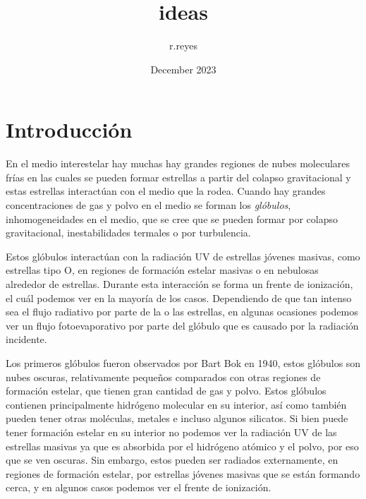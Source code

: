 \documentclass{article}
\title{ideas}
\author{r.reyes }
\date{December 2023}
\begin{document}
\maketitle

\section{Introducción}

En el medio interestelar hay muchas hay grandes regiones de nubes moleculares frías en las cuales se pueden formar estrellas a partir del colapso gravitacional y estas estrellas interactúan con el medio que la rodea. Cuando hay grandes concentraciones de gas y polvo en el medio se forman los \textit{glóbulos}, inhomogeneidades en el medio, que se cree que se pueden formar por colapso gravitacional, inestabilidades termales o por turbulencia. 

Estos glóbulos interactúan con la radiación UV de estrellas jóvenes masivas, como estrellas tipo O, en regiones de formación estelar masivas o en nebulosas alrededor de estrellas. Durante esta interacción se forma un frente de ionización, el cuál podemos ver en la mayoría de los casos. Dependiendo de que tan intenso sea el flujo radiativo por parte de la o las estrellas, en algunas ocasiones podemos ver un flujo fotoevaporativo por parte del glóbulo que es causado por la radiación incidente.

Los primeros glóbulos fueron observados por Bart Bok en 1940, estos glóbulos son nubes oscuras, relativamente pequeños comparados con otras regiones de formación estelar, que tienen gran cantidad de gas y polvo. Estos glóbulos contienen principalmente hidrógeno molecular en su interior, así como también pueden tener otras moléculas, metales e incluso algunos silicatos. Si bien puede tener formación estelar en su interior no podemos ver la radiación UV de las estrellas masivas ya que es absorbida por el hidrógeno atómico y el polvo, por eso que se ven oscuras. Sin embargo, estos pueden ser radiados externamente, en regiones de formación estelar, por estrellas jóvenes masivas que se están formando cerca, y en algunos casos podemos ver el frente de ionización.
\end{document}
